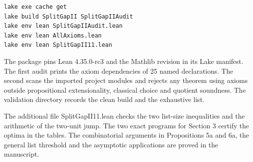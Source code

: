 \documentclass[english,10pt,a4paper]{article}
\begin{document}
\begin{verbatim}
lake exe cache get
lake build SplitGapII SplitGapIIAudit
lake env lean SplitGapIIAudit.lean
lake env lean AllAxioms.lean
lake env lean SplitGapII11.lean
\end{verbatim}

The package pins Lean 4.35.0-rc3 and the Mathlib revision in its Lake manifest. The first audit prints the axiom dependencies of 25 named declarations. The second scans the imported project modules and rejects any theorem using axioms outside propositional extensionality, classical choice and quotient soundness. The validation directory records the clean build and the exhaustive list.

The additional file SplitGapII11.lean checks the two list-size inequalities and the arithmetic of the two-unit jump. The two exact programs for Section 3 certify the optima in the tables. The combinatorial arguments in Propositions 5a and 6a, the general list threshold and the asymptotic applications are proved in the manuscript.
\end{document}
